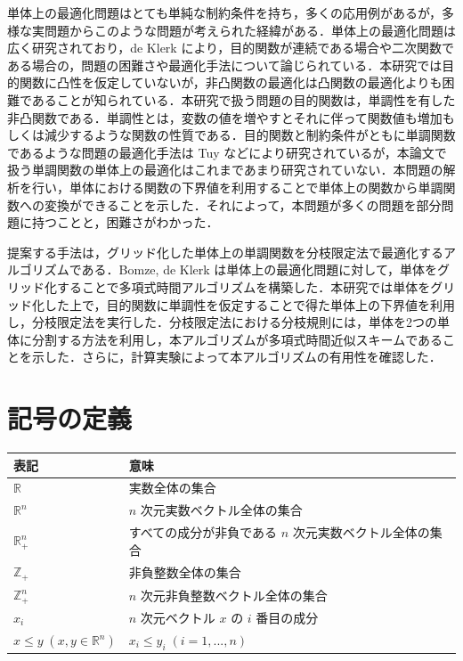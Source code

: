 \documentclass[a4paper,11pt]{jreport}
\begin{document}
単体上の最適化問題はとても単純な制約条件を持ち，多くの応用例があるが，多様な実問題からこのような問題が考えられた経緯がある．単体上の最適化問題は広く研究されており，de Klerk \cite{deklerk_survey} により，目的関数が連続である場合や二次関数である場合の，問題の困難さや最適化手法について論じられている．本研究では目的関数に凸性を仮定していないが，非凸関数の最適化は凸関数の最適化よりも困難であることが知られている．本研究で扱う問題の目的関数は，単調性を有した非凸関数である．単調性とは，変数の値を増やすとそれに伴って関数値も増加もしくは減少するような関数の性質である．目的関数と制約条件がともに単調関数であるような問題の最適化手法は Tuy \cite{tuy} \cite{tuy_survey} などにより研究されているが，本論文で扱う単調関数の単体上の最適化はこれまであまり研究されていない．本問題の解析を行い，単体における関数の下界値を利用することで単体上の関数から単調関数への変換ができることを示した．それによって，本問題が多くの問題を部分問題に持つことと，困難さがわかった．\par
提案する手法は，グリッド化した単体上の単調関数を分枝限定法で最適化するアルゴリズムである．Bomze, de Klerk \cite{bomze} は単体上の最適化問題に対して，単体をグリッド化することで多項式時間アルゴリズムを構築した．本研究では単体をグリッド化した上で，目的関数に単調性を仮定することで得た単体上の下界値を利用し，分枝限定法を実行した．分枝限定法における分枝規則には，単体を2つの単体に分割する方法を利用し，本アルゴリズムが多項式時間近似スキームであることを示した．さらに，計算実験によって本アルゴリズムの有用性を確認した．

\section{記号の定義}

\begin{table}[htb]
\begin{tabular}{ll}
表記 & 意味 \\ \hline
$ \mathbb{R} $ & 実数全体の集合 \\
$ \mathbb{R}^n $ & $ n $ 次元実数ベクトル全体の集合 \\
$ \mathbb{R}_+^n $ & すべての成分が非負である $ n $ 次元実数ベクトル全体の集合 \\
$ \mathbb{Z}_+ $ & 非負整数全体の集合 \\
$ \mathbb{Z}_+^n $ & $ n $ 次元非負整数ベクトル全体の集合 \\
$ x_i $ & $ n $ 次元ベクトル $ x $ の $ i $ 番目の成分 \\
$ x \leq y \; (x, y \in \mathbb{R}^n) $ & $ x_i \leq y_i \; (i = 1, ..., n) $
\end{tabular}
\end{table}
\end{document}
